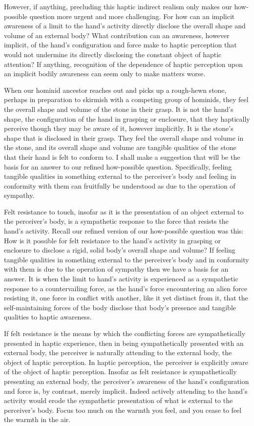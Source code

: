 \documentclass[12pt]{article}
\begin{document}
However, if anything, precluding this haptic indirect realism only makes our how-possible question more urgent and more challenging. For how can an implicit awareness of a limit to the hand's activity directly disclose the overall shape and volume of an external body? What contribution can an awareness, however implicit, of the hand's configuration and force make to haptic perception that would not undermine its directly disclosing the constant object of haptic attention? If anything, recognition of the dependence of haptic perception upon an implicit bodily awareness can seem only to make matters worse.

When our hominid ancestor reaches out and picks up a rough-hewn stone, perhaps in preparation to skirmish with a competing group of hominids, they feel the overall shape and volume of the stone in their grasp. It is not the hand's shape, the configuration of the hand in grasping or enclosure, that they haptically perceive though they may be aware of it, however implicitly. It is the stone's shape that is disclosed in their grasp. They feel the overall shape and volume in the stone, and its overall shape and volume are tangible qualities of the stone that their hand is felt to conform to. I shall make a suggestion that will be the basis for an answer to our refined how-possible question. Specifically, feeling tangible qualities in something external to the perceiver's body and feeling in conformity with them can fruitfully be understood as due to the operation of sympathy.

Felt resistance to touch, insofar as it is the presentation of an object external to the perceiver's body, is a sympathetic response to the force that resists the hand's activity. Recall our refined version of our how-possible question was this: How is it possible for felt resistance to the hand's activity in grasping or enclosure to disclose a rigid, solid body's overall shape and volume? If feeling tangible qualities in something external to the perceiver's body and in conformity with them is due to the operation of sympathy then we have a basis for an answer. It is when the limit to hand's activity is experienced as a sympathetic response to a countervailing force, as the hand's force encountering an alien force resisting it, one force in conflict with another, like it yet distinct from it, that the self-maintaining forces of the body disclose that body's presence and tangible qualities to haptic awareness.

If felt resistance is the means by which the conflicting forces are sympathetically presented in haptic experience, then in being sympathetically presented with an external body, the perceiver is naturally attending to the external body, the object of haptic perception. In haptic perception, the perceiver is explicitly aware of the object of haptic perception. Insofar as felt resistance is sympathetically presenting an external body, the perceiver's awareness of the hand's configuration and force is, by contrast, merely implicit. Indeed actively attending to the hand's activity would erode the sympathetic presentation of what is external to the perceiver's body. Focus too much on the warmth you feel, and you cease to feel the warmth in the air. 
\end{document}
